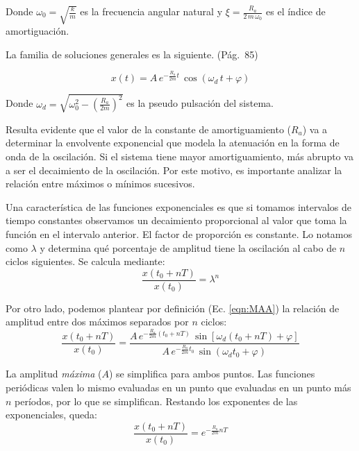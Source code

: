 Donde $\omega_0=\sqrt{\frac{k}{m}}$ es la frecuencia angular natural y $\xi=\frac{R_a}{2 \, m \, \omega_0}$ es el índice de amortiguación.

La familia de soluciones generales es la siguiente. \cite{1} (Pág.~85)

\begin{equation}
    x(t)=A\,e^{-\tfrac{R_a}{2m}t} \, \cos (\omega_d\,t+\varphi)
    \label{eqn:MAA}
\end{equation}

Donde $\omega_d=\sqrt{\omega_0^2 - \left(\tfrac{R_a}{2m}\right)^2 }$ es la pseudo pulsación del sistema.

Resulta evidente que el valor de la constante de amortiguamiento ($R_a$) va a determinar la envolvente exponencial que modela la atenuación en la forma de onda de la oscilación.
Si el sistema tiene mayor amortiguamiento, más abrupto va a ser el decaimiento de la oscilación.
Por este motivo, es importante analizar la relación entre máximos o mínimos sucesivos.

Una característica de las funciones exponenciales es que si tomamos intervalos de tiempo constantes observamos un decaimiento proporcional al valor que toma la función en el intervalo anterior.
El factor de proporción es constante.
Lo notamos como $\lambda$ y determina qué porcentaje de amplitud tiene la oscilación al cabo de $n$ ciclos siguientes.
Se calcula mediante:
\begin{equation*}
    \dfrac{x(t_0+nT)}{x(t_0)}=\lambda^n
\end{equation*}

Por otro lado, podemos plantear por definición (Ec. \ref{eqn:MAA}) la relación de amplitud entre dos máximos separados por $n$ ciclos:
\begin{equation*}
    \dfrac{x(t_0+nT)}{x(t_0)} = \dfrac
    {A\,e^{-\tfrac{R_a}{2m}(t_0+nT)} \, \sin \left[\omega_d (t_0+nT)+\varphi \right]}
    {A\,e^{-\tfrac{R_a}{2m} t_0} \, \sin \left(\omega_d t_0+\varphi \right)}
\end{equation*}

La amplitud \emph{máxima} ($A$) se simplifica para ambos puntos.
Las funciones periódicas valen lo mismo evaluadas en un punto que evaluadas en un punto más $n$ períodos, por lo que se simplifican.
Restando los exponentes de las exponenciales, queda:
\begin{equation*}
    \dfrac{x(t_0+nT)}{x(t_0)} = e^{-\tfrac{R_a}{2m} n T}
\end{equation*}

